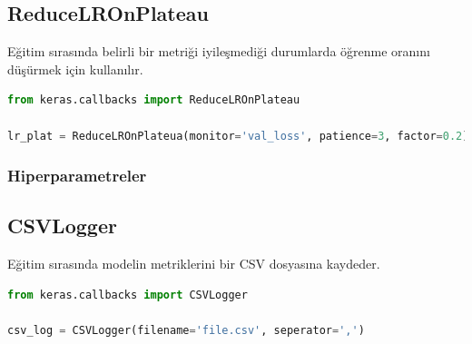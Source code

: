 \subsection{ReduceLROnPlateau}
Eğitim sırasında belirli bir metriği iyileşmediği durumlarda öğrenme oranını düşürmek için kullanılır.

\begin{lstlisting}[language=Python]
from keras.callbacks import ReduceLROnPlateau

lr_plat = ReduceLROnPlateua(monitor='val_loss', patience=3, factor=0.2)
\end{lstlisting}

\subsubsection{Hiperparametreler}
\begin{table}[h]
\centering
{\scriptsize\renewcommand{\arraystretch}{0.4}
{}}
\end{table}

\subsection{CSVLogger}
Eğitim sırasında modelin metriklerini bir CSV dosyasına kaydeder.

\begin{lstlisting}[language=Python]
from keras.callbacks import CSVLogger

csv_log = CSVLogger(filename='file.csv', seperator=',')
\end{lstlisting}

\newpage

